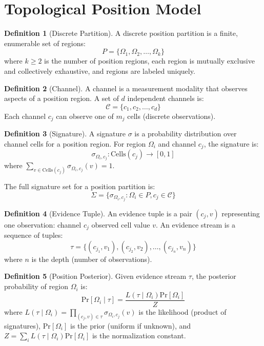 \documentclass[11pt,a4paper]{article}
\theoremstyle{definition}
\newtheorem{definition}{Definition}[section]
\newcommand{\pr}[1]{\mathrm{Pr}\left[#1\right]}
\newcommand{\given}{\mid}
\begin{document}
\section{Topological Position Model}
\label{sec:model}

\begin{definition}[Discrete Partition]
A discrete position partition is a finite, enumerable set of regions:
\[
P = \{\Omega_1, \Omega_2, \ldots, \Omega_k\}
\]
where $k \geq 2$ is the number of position regions, each region is mutually exclusive and collectively exhaustive, and regions are labeled uniquely.
\end{definition}

\begin{definition}[Channel]
A channel is a measurement modality that observes aspects of a position region. A set of $d$ independent channels is:
\[
\mathcal{C} = \{c_1, c_2, \ldots, c_d\}
\]
Each channel $c_j$ can observe one of $m_j$ cells (discrete observations).
\end{definition}

\begin{definition}[Signature]
A signature $\sigma$ is a probability distribution over channel cells for a position region. For region $\Omega_i$ and channel $c_j$, the signature is:
\[
\sigma_{\Omega_i, c_j} : \text{Cells}(c_j) \to [0,1]
\]
where $\sum_{v \in \text{Cells}(c_j)} \sigma_{\Omega_i, c_j}(v) = 1$.

The full signature set for a position partition is:
\[
\Sigma = \{\sigma_{\Omega_i, c_j} : \Omega_i \in P, c_j \in \mathcal{C}\}
\]
\end{definition}

\begin{definition}[Evidence Tuple]
An evidence tuple is a pair $(c_j, v)$ representing one observation: channel $c_j$ observed cell value $v$. An evidence stream is a sequence of tuples:
\[
\tau = \{(c_{j_1}, v_1), (c_{j_2}, v_2), \ldots, (c_{j_n}, v_n)\}
\]
where $n$ is the depth (number of observations).
\end{definition}

\begin{definition}[Position Posterior]
Given evidence stream $\tau$, the posterior probability of region $\Omega_i$ is:
\[
\pr{\Omega_i \given \tau} = \frac{L(\tau \given \Omega_i) \pr{\Omega_i}}{Z}
\]
where $L(\tau \given \Omega_i) = \prod_{(c_j, v) \in \tau} \sigma_{\Omega_i, c_j}(v)$ is the likelihood (product of signatures), $\pr{\Omega_i}$ is the prior (uniform if unknown), and $Z = \sum_{i} L(\tau \given \Omega_i) \pr{\Omega_i}$ is the normalization constant.
\end{definition}
\end{document}
